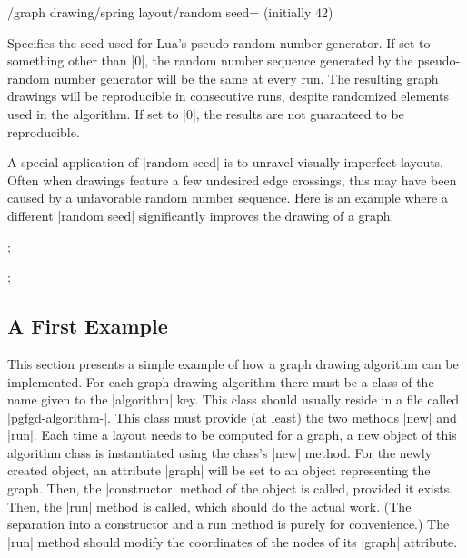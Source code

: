\begin{key}{/graph drawing/spring layout/random seed= 
  (initially 42)}
  
  Specifies the seed used for Lua's pseudo-random number generator. If
  set to something other than |0|, the random number sequence generated
  by the pseudo-random number generator will be the same at every run.
  The resulting graph drawings will be reproducible in consecutive runs,
  despite randomized elements used in the algorithm.
  If set to |0|, the results are not guaranteed to be reproducible.
  
  A special application of |random seed| is to unravel visually
  imperfect layouts. Often when drawings feature a few undesired edge
  crossings, this may have been caused by a unfavorable random number
  sequence. Here is an example where a different |random seed| 
  significantly improves the drawing of a graph:
  \begin{codeexample}[width=6.0cm]
\tikz {};

\tikz {};
  \end{codeexample}
%
\end{key}


\subsection{A First Example}

This section presents a simple example of how a graph drawing
algorithm can be implemented. For each graph drawing algorithm
there must be a class of the name given to the |algorithm| key. This
class should usually reside in a file called
|pgfgd-algorithm-|. This class must provide (at
least) the two methods |new| and |run|. Each time a layout needs to
be computed for a graph, a new object of this algorithm class is
instantiated using the class's |new| method. For the newly created
object, an attribute |graph| will be set to an object representing the
graph. Then, the |constructor| method of the object is called,
provided it exists. Then, the |run| method is called, which should do
the actual work. (The separation into a constructor and a run method
is purely for convenience.) The |run| method should modify the
coordinates of the nodes of its |graph| attribute.

